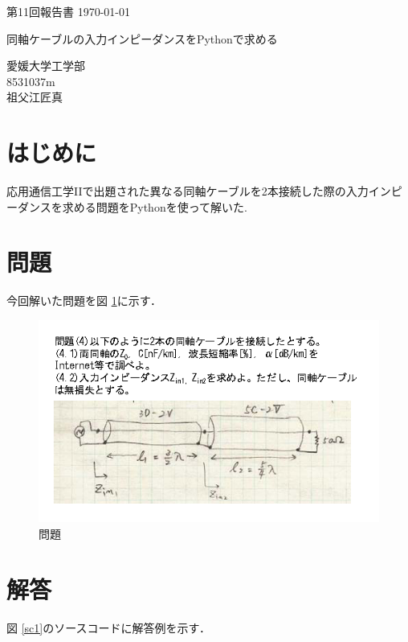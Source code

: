 \documentclass[a4j,12pt,]{jarticle}
\begin{document}
{\noindent\small 第11回報告書 \hfill\today}
\begin{center}
  {\Large 同軸ケーブルの入力インピーダンスをPythonで求める}
\end{center}
\begin{flushright}
  愛媛大学工学部 \\
  8531037m \\
  祖父江匠真 \\
\end{flushright}

\section{はじめに}

応用通信工学IIで出題された異なる同軸ケーブルを2本接続した際の入力インピーダンスを求める問題をPythonを使って解いた.

\section{問題}

今回解いた問題を図 \ref{p1}に示す．

\begin{figure}[H]
  \begin{center}
    \includegraphics[width=140mm]{q4.png}
    \caption{問題}
    \label{p1}
  \end{center}
\end{figure}

\newpage

\section{解答}

図 \ref{sc1}のソースコードに解答例を示す．
\end{document}
